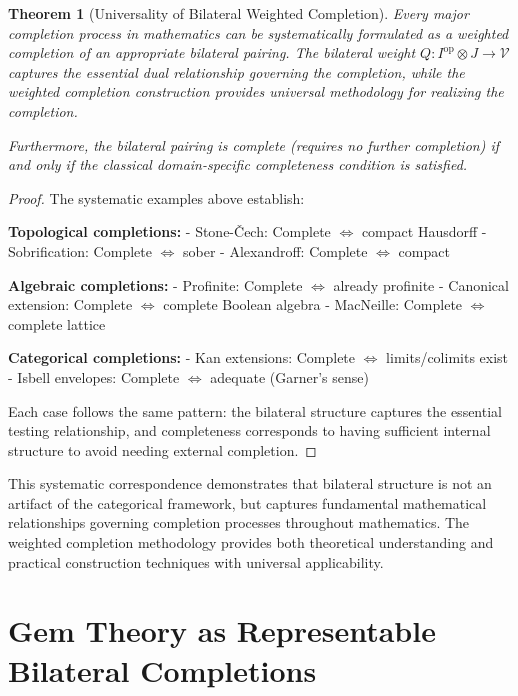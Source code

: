 \documentclass[11pt]{article}
\theoremstyle{plain}
\newtheorem{theorem}{Theorem}[section]
\theoremstyle{definition}
\theoremstyle{remark}
\newcommand{\V}{\mathcal{V}}
\newcommand{\op}{\mathrm{op}}
\begin{document}
\begin{theorem}[Universality of Bilateral Weighted Completion]\label{thm:universal-examples}
Every major completion process in mathematics can be systematically formulated as a weighted completion of an appropriate bilateral pairing. The bilateral weight $Q : I^{\op} \otimes J \to \V$ captures the essential dual relationship governing the completion, while the weighted completion construction provides universal methodology for realizing the completion.

Furthermore, the bilateral pairing is complete (requires no further completion) if and only if the classical domain-specific completeness condition is satisfied.
\end{theorem}

\begin{proof}
The systematic examples above establish:

\textbf{Topological completions:}
- Stone-\v{C}ech: Complete $\Leftrightarrow$ compact Hausdorff
- Sobrification: Complete $\Leftrightarrow$ sober
- Alexandroff: Complete $\Leftrightarrow$ compact

\textbf{Algebraic completions:}
- Profinite: Complete $\Leftrightarrow$ already profinite  
- Canonical extension: Complete $\Leftrightarrow$ complete Boolean algebra
- MacNeille: Complete $\Leftrightarrow$ complete lattice

\textbf{Categorical completions:}
- Kan extensions: Complete $\Leftrightarrow$ limits/colimits exist
- Isbell envelopes: Complete $\Leftrightarrow$ adequate (Garner's sense)

Each case follows the same pattern: the bilateral structure captures the essential testing relationship, and completeness corresponds to having sufficient internal structure to avoid needing external completion.
\end{proof}

This systematic correspondence demonstrates that bilateral structure is not an artifact of the categorical framework, but captures fundamental mathematical relationships governing completion processes throughout mathematics. The weighted completion methodology provides both theoretical understanding and practical construction techniques with universal applicability.

\section{Gem Theory as Representable Bilateral Completions}
\end{document}
